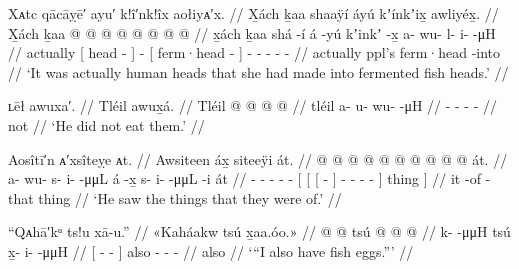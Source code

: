 \ex\label{ex:91-256-human-heads-made-into-kink}%
%
\begingl
	\glpreamble	Xᴀtc qācāỵē′ ayu′ k!î′nk!îx aołiyᴀ′x. //
	\glpreamble	X̱ách ḵaa shaaÿí áyú kʼínkʼix̱ awliyéx̱. //
	\gla	X̱ách {} ḵaa  @ {} {}  @ {}
		{}  @ {} {}
		 @ {} @ {} @ {} @ {} @ {} //
	\glb	x̱ách {} ḵaa shá -í {} á -yú
		{} kʼinkʼ -x̱ {}
		a- wu- l- i-  -μH //
	\glc	actually {}[  head - {}]  -
		{}[ ferm·head - {}]
		- - - -  - //
	\gld	actually {} ppl’s  {} {}  {}
		{} ferm·head -into {}
		 {} {} {} {} {} //
	\glft	‘It was actually human heads that she had made into fermented fish heads.’
		//
\endgl
\xe

\ex\label{ex:91-257-didnt-eat}%
%
\begingl
	\glpreamble	ʟēł awuxa′. //
	\glpreamble	Tléil awux̱á. //
	\gla	Tléil  @ {} @ {} @ {} @ {} //
	\glb	tléil a- u- wu-  -μH //
	\glc	{} - - -  - //
	\gld	not  {} {} {} {} //
	\glft	‘He did not eat them.’
		//
\endgl
\xe

\ex\label{ex:91-258-saw-what-made-of}%
%
\begingl
	\glpreamble	Aosîtī′n ᴀ′xsîteỵe ᴀt. //
	\glpreamble	Awsiteen áx̱ siteeÿi át. //
	\gla	{} @ {} @ {} @ {} @ {} @ {}
		{} {} {}  @ {} {}  @ {} @ {} @ {} @ {} {} át. {} //
	\glb	a- wu- s- i-  -μμL
		{} {} {} á -x̱ {} s- i-  -μμL -i {} át {} //
	\glc	{}- - - -  -
		{}[ {}[ {}[  - {}]
			- -  - - {}] thing {}] //
	\gld	{} {} {} {} {} {}
		{} {} {} it -of {}  {} {} {} -that {} thing {} //
	\glft	‘He saw the things that they were of.’
		//
\endgl
\xe

\ex\label{ex:91-259-I-also-have-fish-eggs}%
%
\begingl
	\glpreamble	“Qᴀhā′kᵘ ts!u xā-u.” //
	\glpreamble	«\!Kaháakw tsú x̱aa.óo.\!» //
	\gla	{}  @ {} @ {} {} tsú
		 @ {} @ {} @ {} //
	\glb	{} k-  -μμH {} tsú
		x̱- i-  -μμH //
	\glc	{}[ -  - {}] also
		- -  - //
	\gld	{}  {} {} {} also
		 {} {} {} //
	\glft	‘“I also have fish eggs.”’
		//
\endgl
\xe

